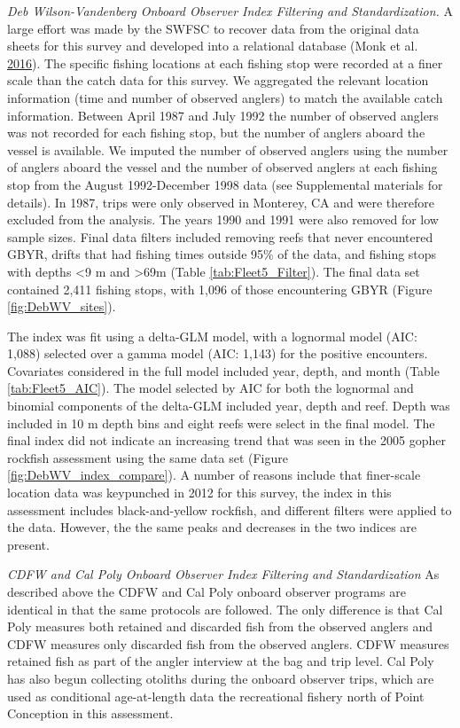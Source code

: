 \documentclass[12pt,]{article}
\begin{document}
\emph{Deb Wilson-Vandenberg Onboard Observer Index Filtering and
Standardization.} A large effort was made by the SWFSC to recover data
from the original data sheets for this survey and developed into a
relational database (Monk et al.
\protect\hyperlink{ref-Monk2016}{2016}). The specific fishing locations
at each fishing stop were recorded at a finer scale than the catch data
for this survey. We aggregated the relevant location information (time
and number of observed anglers) to match the available catch
information. Between April 1987 and July 1992 the number of observed
anglers was not recorded for each fishing stop, but the number of
anglers aboard the vessel is available. We imputed the number of
observed anglers using the number of anglers aboard the vessel and the
number of observed anglers at each fishing stop from the August
1992-December 1998 data (see Supplemental materials for details). In
1987, trips were only observed in Monterey, CA and were therefore
excluded from the analysis. The years 1990 and 1991 were also removed
for low sample sizes. Final data filters included removing reefs that
never encountered GBYR, drifts that had fishing times outside 95\% of
the data, and fishing stops with depths \textless{}9 m and
\textgreater{}69m (Table \ref{tab:Fleet5_Filter}). The final data set
contained 2,411 fishing stops, with 1,096 of those encountering GBYR
(Figure \ref{fig:DebWV_sites}).

The index was fit using a delta-GLM model, with a lognormal model (AIC:
1,088) selected over a gamma model (AIC: 1,143) for the positive
encounters. Covariates considered in the full model included year,
depth, and month (Table \ref{tab:Fleet5_AIC}). The model selected by AIC
for both the lognormal and binomial components of the delta-GLM included
year, depth and reef. Depth was included in 10 m depth bins and eight
reefs were select in the final model. The final index did not indicate
an increasing trend that was seen in the 2005 gopher rockfish assessment
using the same data set (Figure \ref{fig:DebWV_index_compare}). A number
of reasons include that finer-scale location data was keypunched in 2012
for this survey, the index in this assessment includes black-and-yellow
rockfish, and different filters were applied to the data. However, the
the same peaks and decreases in the two indices are present.

\emph{CDFW and Cal Poly Onboard Observer Index Filtering and
Standardization} As described above the CDFW and Cal Poly onboard
observer programs are identical in that the same protocols are followed.
The only difference is that Cal Poly measures both retained and
discarded fish from the observed anglers and CDFW measures only
discarded fish from the observed anglers. CDFW measures retained fish as
part of the angler interview at the bag and trip level. Cal Poly has
also begun collecting otoliths during the onboard observer trips, which
are used as conditional age-at-length data the recreational fishery
north of Point Conception in this assessment.
\end{document}
